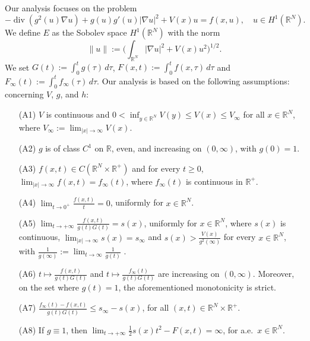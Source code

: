 \documentclass[10pt,a4paper]{amsart}
\numberwithin{equation}{section}
\begin{document}
Our analysis focuses on the problem
\begin{equation}
\label{q1}
-\operatorname{div} (g^2(u)\nabla u)+g(u)g'(u)|\nabla u|^2+V(x)u=f(x,u), \quad u\in H^1(\mathbb{R}^{N}).
\end{equation}
We define   $E$ as the Sobolev space $H^{1}(\mathbb{R}^{N})$  with the norm 
$$
\|u\|:=\Big(\int_{\mathbb{R}^N}|\nabla u|^2+V(x)u^2\Big)^{1/2}.
$$ 
We set $G(t):=\int^t_0g(\tau)\,d\tau$,  $F(x,t):=\int^t_0f(x,\tau)\,d\tau$ and 
$F_{\infty}(t):=\int^t_0f_{\infty}(\tau)\,d\tau$. Our analysis is based on the following assumptions: concerning $V$, $g$, and $h$:
\begin{itemize}
\item[(A1)] $V$ is continuous and $0<\inf_{y\in{\mathbb{R}^N}} V(y)\leq V(x)\leq V_\infty$ for all
 $x\in {\mathbb{R}^N}$, where $V_{\infty}:=\lim_{|x| \to \infty} V(x)$.

\item[(A2)]  \(g\) is of class \(C^1\) on \(\mathbb{R}\), even, and  increasing on $ (0,\infty)$, with $g(0)=1$.

\item[(A3)] $f(x,t)\in C({\mathbb{R}^N}\times\mathbb{R}^+)$ and for every $t\geq 0$, 
$\lim_{|x|\to\infty}f(x,t)=f_{\infty}(t)$, where $f_{\infty}(t)$ is continuous in $\mathbb{R}^+$.

\item[(A4)] $\lim_{t\to0^+}\frac{f(x,t)}{t}=0$, uniformly for $x\in{\mathbb{R}^N}$.

\item[(A5)] $\lim_{t\to+\infty}\frac{f(x,t)}{g(t)G(t)}=s(x)$, uniformly for $x\in{\mathbb{R}^N}$, where $s(x)$ 
is continuous, $\lim_{|x| \to \infty} s(x) = s_{\infty}$ and $s(x)>\frac{V(x)}{g^2(\infty)}$ for every 
$x\in{\mathbb{R}^N}$, with $\frac{1}{g(\infty)}:=\lim_{t\to\infty}\frac{1}{g(t)}$ .

\item[(A6)] $t\mapsto \frac{f(x,t)}{g(t)G(t)}$ and $t\mapsto \frac{f_\infty(t)}{g(t)G(t)}$ are increasing 
on $(0,\infty)$. Moreover, on the set where $g(t)=1$, the aforementioned monotonicity is strict.

\item[(A7)] $\frac{f_{\infty}(t)-f(x,t)}{g(t)G(t)}\leq s_{\infty}-s(x)$, for all $(x,t)\in{\mathbb{R}^N}\times\mathbb{R}^+$.

\item[(A8)] If $g\equiv 1$, then $\lim_{t\to+\infty}\frac{1}{2}s(x)t^2-F(x,t)=\infty$, for a.e.\
 $x\in {\mathbb{R}^N}$.


\end{itemize}
\end{document}
